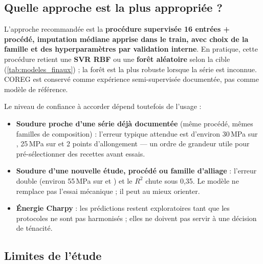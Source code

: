 \subsection{Quelle approche est la plus appropriée ?}

\begin{decision}
L'approche recommandée est la \textbf{procédure supervisée 16 entrées + procédé,
imputation médiane apprise dans le train, avec choix de la famille et des
hyperparamètres par validation interne}. En pratique, cette procédure retient
une \textbf{SVR RBF} ou une \textbf{forêt aléatoire} selon la cible
(\cref{tab:modeles_finaux}) ; la forêt est la plus robuste lorsque la série est
inconnue. COREG est conservé comme expérience semi-supervisée documentée, pas
comme modèle de référence.
\end{decision}

Le niveau de confiance à accorder dépend toutefois de l'usage :
\begin{itemize}
  \item \textbf{Soudure proche d'une série déjà documentée} (même procédé, mêmes familles de composition) : l'erreur typique attendue est d'environ 30\,MPa sur \YS, 25\,MPa sur \UTS{} et 2 points d'allongement --- un ordre de grandeur utile pour pré-sélectionner des recettes avant essais.
  \item \textbf{Soudure d'une nouvelle étude, procédé ou famille d'alliage} : l'erreur double (environ 55\,MPa sur \YS{} et \UTS) et le $R^2$ chute sous 0,35. Le modèle ne remplace pas l'essai mécanique ; il peut au mieux orienter.
  \item \textbf{Énergie Charpy} : les prédictions restent exploratoires tant que les protocoles ne sont pas harmonisés ; elles ne doivent pas servir à une décision de ténacité.
\end{itemize}

\subsection{Limites de l'étude}

